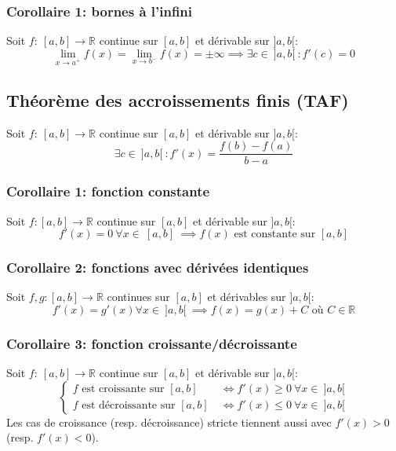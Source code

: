 \documentclass{article}
\begin{document}
\subsubsection{Corollaire 1: bornes à l'infini}
Soit \(f : \ [a, b] \to \mathbb{R}\) continue sur \([a, b]\) et dérivable sur \(]a, b[\):
\begin{equation*}
	\lim\limits_{x \to a^+} f(x) = \lim\limits_{x \to b^-} f(x) = \pm \infty \implies \exists c \in \ ]a, b[ \ : f'(c) = 0
\end{equation*}

\subsection{Théorème des accroissements finis (TAF)}
Soit \(f : \ [a, b] \to \mathbb{R}\) continue sur \([a, b]\) et dérivable sur \(]a, b[\):
\begin{equation*}
	\exists c \in \ ]a, b[ \ : f'(x) = \frac{f(b) - f(a)}{b - a}
\end{equation*}

\subsubsection{Corollaire 1: fonction constante}
Soit \(f : [a, b] \to \mathbb{R}\) continue sur \([a, b]\) et dérivable sur \(]a, b[\):
\begin{equation*}
	f'(x) = 0 \ \forall x \in \ [a, b] \ \implies f(x) \text{ est constante sur } [a, b]
\end{equation*}

\subsubsection{Corollaire 2: fonctions avec dérivées identiques}
Soit \(f, g : [a, b] \to \mathbb{R}\) continues sur \([a, b]\) et dérivables sur \(]a, b[\):
\begin{equation*}
	f'(x) = g'(x) \forall x \in \ ]a, b[ \ \implies f(x) = g(x) + C \text{ où } C \in \mathbb{R}
\end{equation*}

\subsubsection{Corollaire 3: fonction croissante/décroissante}
Soit \(f : \ [a, b] \to \mathbb{R}\) continue sur \([a, b]\) et dérivable sur \(]a, b[\):
\begin{equation*}
	\begin{cases}
		f \text{ est croissante sur } [a, b] \ &\iff f'(x) \geq 0 \ \forall x \in \ ]a, b[ \\
		f \text{ est décroissante sur } [a, b] \ &\iff f'(x) \leq 0 \ \forall x \in \ ]a, b[
	\end{cases}
\end{equation*}
Les cas de croissance (resp. décroissance) stricte tiennent aussi avec \(f'(x) > 0\) (resp. \(f'(x) < 0\)).
\end{document}
